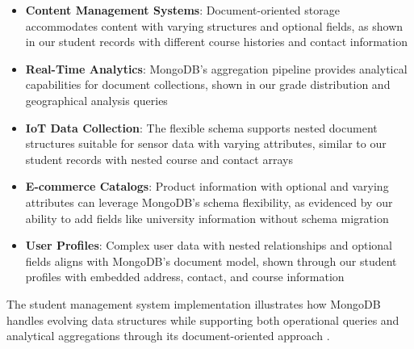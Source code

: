 \begin{itemize}
    \item \textbf{Content Management Systems}: Document-oriented storage accommodates content with varying structures and optional fields, as shown in our student records with different course histories and contact information \parencite{mongodb_architecture}
    \item \textbf{Real-Time Analytics}: MongoDB's aggregation pipeline provides analytical capabilities for document collections, shown in our grade distribution and geographical analysis queries \parencite{mongodb_architecture}
    \item \textbf{IoT Data Collection}: The flexible schema supports nested document structures suitable for sensor data with varying attributes, similar to our student records with nested course and contact arrays \parencite{mongodb_definitive_guide}
    \item \textbf{E-commerce Catalogs}: Product information with optional and varying attributes can leverage MongoDB's schema flexibility, as evidenced by our ability to add fields like university information without schema migration \parencite{mongodb_architecture}
    \item \textbf{User Profiles}: Complex user data with nested relationships and optional fields aligns with MongoDB's document model, shown through our student profiles with embedded address, contact, and course information \parencite{mongodb_definitive_guide}
\end{itemize}

The student management system implementation illustrates how MongoDB handles evolving data structures while supporting both operational queries and analytical aggregations through its document-oriented approach \parencite{mongodb_architecture}.